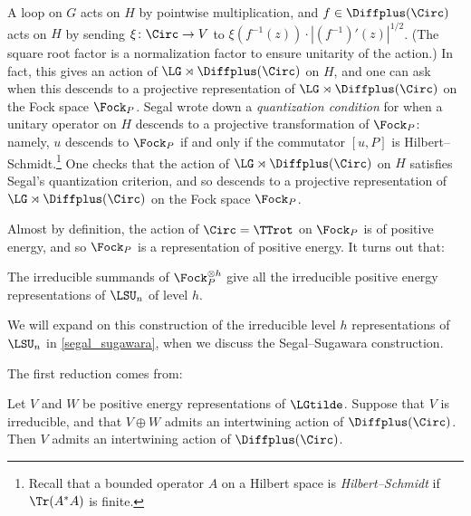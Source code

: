 A loop on $G$ acts on $H$ by pointwise multiplication, and $f\in \Diffplus(\Circ)$
acts on $H$ by sending $\xi \colon \Circ\to V$ to $\xi(f^{-1}(z)) \cdot
|(f^{-1})'(z)|^{1/2}$. (The square root factor is a normalization factor to
ensure unitarity of the action.) In fact, this gives an action of $\LG\rtimes
\Diffplus(\Circ)$ on $H$, and one can ask when this descends to a projective
representation of $\LG \rtimes \Diffplus(\Circ)$ on the Fock space $\Fock_P$. Segal
wrote down a \emph{quantization condition} for when a unitary operator on $H$ descends to a projective
transformation of $\Fock_P$: namely, $u$ descends to $\Fock_P$ if and only if the commutator $[u,P]$ is
Hilbert--Schmidt.\footnote{Recall that a bounded operator $A$ on a Hilbert space is \textit{Hilbert--Schmidt} if
$\Tr(A^\ast A)$ is finite.} One checks that the action of $\LG \rtimes \Diffplus(\Circ)$ on $H$ satisfies Segal's
quantization criterion, and so descends to a projective representation of $\LG \rtimes \Diffplus(\Circ)$ on the
Fock space $\Fock_P$.

Almost by definition, the action of $\Circ = \TTrot$ on $\Fock_P$ is of positive
energy, and so $\Fock_P$ is a representation of positive energy. 
It turns out that:

\begin{theorem}\label{sun-summand}
	The irreducible summands of $\Fock_P^{\otimes h}$ give all the irreducible
	positive energy representations of $\LSU_n$ of level $h$.
\end{theorem}

%
We will expand on this construction of the irreducible level $h$ representations of $\LSU_n$ in
\cref{segal_sugawara}, when we discuss the Segal--Sugawara construction.

The first reduction comes from:
\begin{lemma}
\label{summand}
	Let $V$ and $W$ be positive energy representations of $\LGtilde$. Suppose
	that $V$ is irreducible, and that $V\oplus W$ admits an intertwining action
	of $\Diffplus(\Circ)$. Then $V$ admits an intertwining action of $\Diffplus(\Circ)$.
\end{lemma}

